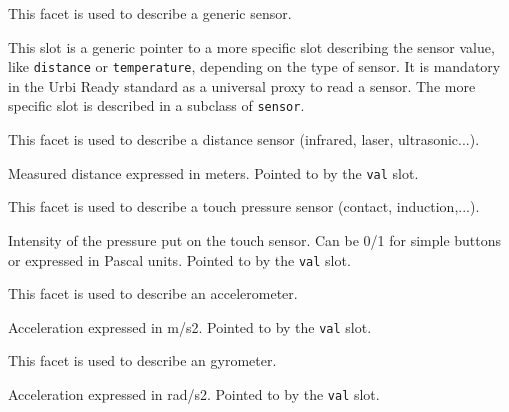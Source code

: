 
This facet is used to describe a generic sensor.

\begin{slots}
  {%
    This slot is a generic pointer to a more specific slot describing
    the sensor value, like \texttt{distance} or \texttt{temperature},
    depending on the type of sensor. It is mandatory in the Urbi Ready
    standard as a universal proxy to read a sensor. The more specific
    slot is described in a subclass of \texttt{sensor}.%
  }

\end{slots}



This facet is used to describe a distance sensor (infrared, laser,
ultrasonic...).

\begin{slots}
  {%
    Measured distance expressed in meters.  Pointed to by the
    \texttt{val} slot.%
  }

\end{slots}



This facet is used to describe a touch pressure sensor (contact,
induction,...).

\begin{slots}
  {%
    Intensity of the pressure put on the touch sensor. Can be 0/1 for
    simple buttons or expressed in Pascal units. Pointed to by the
    \texttt{val} slot.%
  }

\end{slots}



This facet is used to describe an accelerometer.

\begin{slots}
  {%
    Acceleration expressed in m/s2.  Pointed to by the \texttt{val}
    slot.%
  }

\end{slots}

This facet is used to describe an gyrometer.

\begin{slots}
  {%
    Acceleration expressed in rad/s2.  Pointed to by the \texttt{val}
    slot.%
  }

\end{slots}

